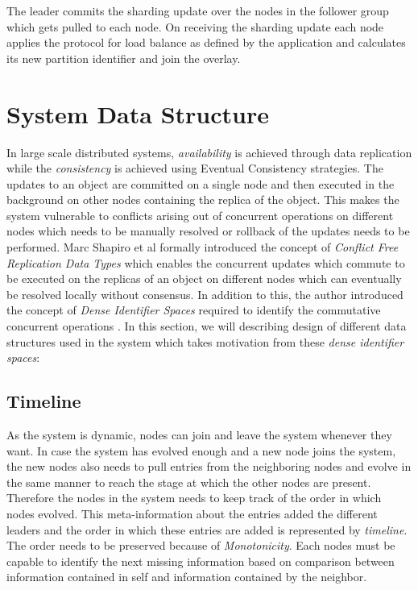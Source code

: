 \documentclass[a4paper,11pt]{kth-mag}
\begin{document}
\par The leader commits the sharding update over the nodes in the follower group which gets pulled to each node. On receiving the sharding update each node applies the protocol for load balance as defined by the application and calculates its new partition identifier and join the overlay.

\section{System Data Structure}
\label{sec:dataStructure}

In large scale distributed systems, \textit{availability} is achieved through data replication while the \textit{consistency} is achieved using Eventual Consistency strategies. The updates to an object are committed on a single node and then executed in the background on other nodes containing the replica of the object. This makes the system vulnerable to conflicts arising out of concurrent operations on different nodes which needs to be manually resolved or rollback of the updates needs to be performed. Marc Shapiro et al formally introduced the concept of \textit{Conflict Free Replication Data Types} \cite{crdt} \cite{crdtConcurrencyWithoutControl} which  enables the concurrent updates which commute to be executed on the replicas of an object on different nodes which can eventually be resolved locally without consensus. In addition to this, the author introduced the concept of \textit{Dense Identifier Spaces} required to identify the commutative concurrent operations \cite{crdtConcurrencyWithoutControl}. In this section, we will describing design of different data structures used in the system which takes motivation from these \textit{dense identifier spaces}:

\subsection{Timeline}

As the system is dynamic, nodes can join and leave the system whenever they want. In case the system has evolved enough and a new node joins the system, the new nodes also needs to pull entries from the neighboring nodes and evolve in the same manner to reach the stage at which the other nodes are present. Therefore the nodes in the system needs to keep track of the order in which nodes evolved. This meta-information about the entries added the different leaders and the order in which these entries are added is represented by \textit{timeline}. The order needs to be preserved because of \textit{Monotonicity}. Each nodes must be capable to identify the next missing information based on comparison between information contained in self and information contained by the neighbor.
\end{document}
